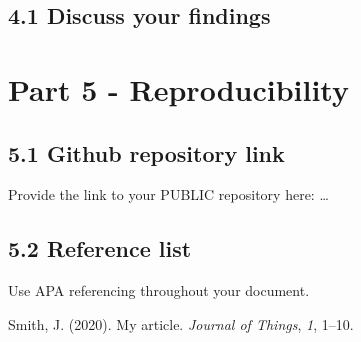 \documentclass[
]{article}
\newlength{\cslhangindent}
\newenvironment{CSLReferences}[2] %
 {\begin{list}{}{%
  \setlength{\itemindent}{0pt}
  \setlength{\leftmargin}{0pt}
  \setlength{\parsep}{0pt}
  \ifodd #1
   \setlength{\leftmargin}{\cslhangindent}
   \setlength{\itemindent}{-1\cslhangindent}
  \fi
  \setlength{\itemsep}{#2\baselineskip}}}
 {\end{list}}
\begin{document}
\subsection{4.1 Discuss your findings}\label{discuss-your-findings}

\section{Part 5 - Reproducibility}\label{part-5---reproducibility}

\subsection{5.1 Github repository link}\label{github-repository-link}

Provide the link to your PUBLIC repository here: \ldots{}

\subsection{5.2 Reference list}\label{reference-list}

Use APA referencing throughout your document.

\protect{}\label{refs}
\begin{CSLReferences}{1}{0}
Smith, J. (2020). My article. \emph{Journal of Things}, \emph{1}, 1--10.

\end{CSLReferences}
\end{document}
